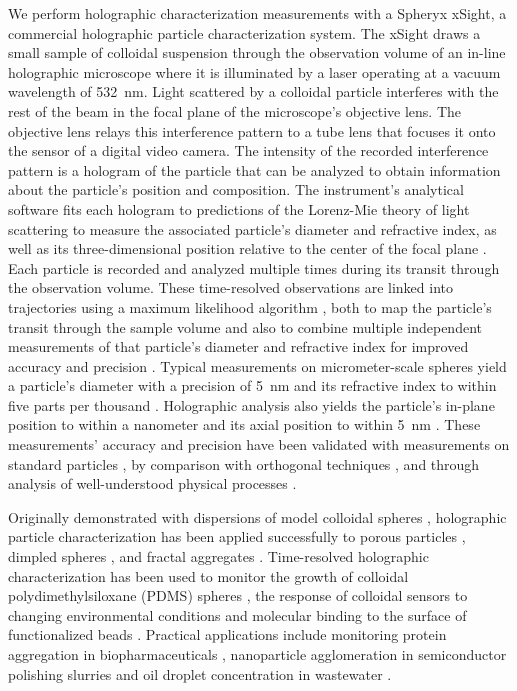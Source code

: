\documentclass[journal=langd5,manuscript=article]{achemso}
\begin{document}
We perform holographic characterization measurements with a Spheryx xSight,
a commercial holographic particle characterization system.
The xSight draws a small sample of colloidal suspension through the
observation volume of an in-line holographic microscope where it is illuminated
by a laser operating at a vacuum wavelength of \SI{532}{\nm}.
Light scattered by a colloidal particle interferes with the rest of the
beam in the focal plane of the microscope's objective lens.
The objective lens relays this interference pattern to a tube
lens that focuses it onto the sensor of a digital video camera.
The intensity of the recorded interference pattern is
a hologram of the particle that can be analyzed \cite{lee07a}
to obtain information
about the particle's position and composition.
The instrument's analytical software fits each hologram 
to predictions of the Lorenz-Mie theory of light scattering
\cite{bohren83,mishchenko02,gouesbet11}
to measure the associated particle's diameter and refractive index, as well as its
three-dimensional position relative to the center of the 
focal plane \cite{lee07a}.
Each particle is recorded and analyzed multiple times during its
transit through the observation volume.
These time-resolved observations are linked into trajectories
using a maximum likelihood algorithm
\cite{crocker1996methods}, both to map the particle's
transit through the sample volume and also to
combine multiple independent measurements 
of that particle's diameter and refractive index
for improved accuracy and precision \cite{cheong2009flow}.
Typical measurements on micrometer-scale spheres yield
a particle's diameter with a precision of
\SI{5}{\nm} and its refractive index to
within five parts per thousand
\cite{krishnatreya14,wang2016holographic}.
Holographic analysis also yields the particle's
in-plane position to within a nanometer and its
axial position to within \SI{5}{\nm}
\cite{cheong2009flow,krishnatreya14}.
These measurements' accuracy and precision have
been validated with measurements on standard
particles \cite{lee07a,wang2016holographic},
by comparison with orthogonal techniques \cite{wang2016holographic},
and through analysis of well-understood physical processes
\cite{krishnatreya14}.

Originally demonstrated with dispersions of model
colloidal spheres \cite{lee07a},
holographic particle characterization has been
applied successfully to porous particles \cite{cheong11},
dimpled spheres \cite{hannel2015holographic},
and fractal aggregates \cite{wang2016fractal}.
Time-resolved holographic characterization has been used to
monitor the growth of colloidal polydimethylsiloxane (PDMS)
spheres \cite{wang15}, the response of colloidal
sensors to changing environmental conditions
\cite{wang2015stimulus} and molecular binding
to the surface of functionalized beads \cite{cheong2009flow}.
Practical applications include monitoring protein aggregation 
in biopharmaceuticals
\cite{wang2016holographic,kasimbeg2019holographic}, 
nanoparticle agglomeration in semiconductor polishing
slurries \cite{cheong17} and oil droplet concentration in
wastewater \cite{philips2017holographic}.
\end{document}
